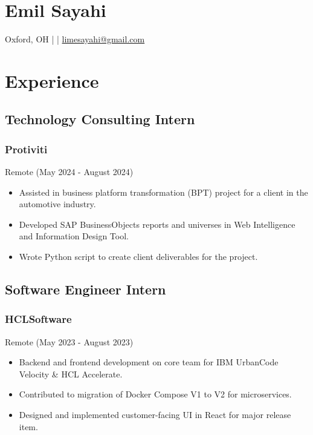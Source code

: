 \documentclass[letterpaper,9pt]{extarticle}
\begin{document}
    \pagestyle{empty}
    \raggedright%
    \section*{Emil Sayahi}
    \small
    Oxford, OH |
    \href{tel:+1-513-484-0972}{\color{black}{+1 (513) 484-0972}}
    |
    \href{mailto:limesayahi@gmail.com}{\color{black}limesayahi@gmail.com}\\
    \normalsize

    \raggedright%
    \begin{minipage}[t]{0.60\textwidth}
        \section*{Experience}
        \subsection*{Technology Consulting Intern}
        \subsubsection*{Protiviti}
        Remote (May 2024 - August 2024)\\
        \begin{itemize}
            \item Assisted in business platform transformation (BPT) project for a client in the automotive industry.
            \item Developed SAP BusinessObjects reports and universes in Web Intelligence and Information Design Tool.
            \item Wrote Python script to create client deliverables for the project.
        \end{itemize}

        \subsection*{Software Engineer Intern}
        \subsubsection*{HCLSoftware}
        Remote (May 2023 - August 2023)\\
        \begin{itemize}
            \item Backend and frontend development on core team for IBM UrbanCode Velocity \& HCL Accelerate.
            \item Contributed to migration of Docker Compose V1 to V2 for microservices.
            \item Designed and implemented customer-facing UI in React for major release item.
        \end{itemize}


\end{minipage}
\end{document}

